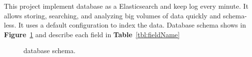 \documentclass[12pt,oneside,openright,a4paper]{cpe-english-project}
\begin{document}
\hspace{10mm}This project implement database as a Elasticsearch and keep log every minute. It allows storing, searching, and analyzing big volumes of data quickly and schema-less. It uses a default configuration to index the data. Database schema shows in \textbf{Figure}~\ref{fig:database} and describe each field in \textbf{Table}~\ref{tbl:fieldName}

\begin{figure}[!h]\centering
  \setlength{\fboxrule}{0mm} %
  \setlength{\fboxsep}{0cm}
  \caption{database schema.}\label{fig:database}
\end{figure}
\end{document}
